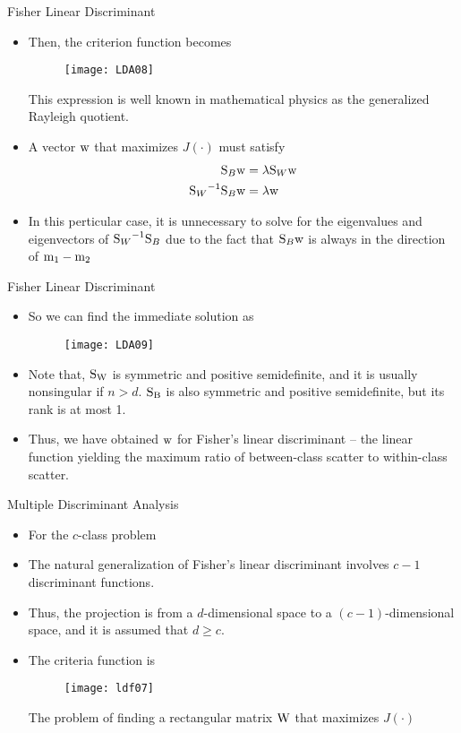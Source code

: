 \begin{frame}{Fisher Linear Discriminant}
\begin{itemize}
\item Then, the criterion function becomes
\begin{figure}
\texttt{[image: LDA08]}
\end{figure}
This expression is well known in mathematical physics as the generalized Rayleigh quotient.
\item A vector ${\rm w}$ that maximizes $J(\cdot)$ must satisfy
\begin{align}
{\rm S}_B{\rm w}&=\lambda {\rm S}_W{\rm w} \nonumber\\
{{\rm S}_W}^{-1}{\rm S}_B{\rm w}&=\lambda {\rm w}\nonumber
\end{align}
\item In this perticular case, it is unnecessary to solve for the eigenvalues and eigenvectors of ${{\rm S}_W}^{-1}{\rm S}_B$ due to the fact that ${\rm S}_B{\rm w}$ is always in the direction of ${\rm m}_1-{\rm m}_2$
\end{itemize}
\end{frame}

\begin{frame}{Fisher Linear Discriminant}
\begin{itemize}
\item So we can find the immediate solution as
\begin{figure}
\texttt{[image: LDA09]}
\end{figure}
\item Note that, ${\rm S_W}$ is symmetric and positive semidefinite, and it is usually nonsingular if $n > d$. ${\rm S_B}$ is also symmetric and positive semidefinite, but its rank is at most 1.
\item Thus, we have obtained ${\rm w}$ for Fisher's linear discriminant -- the linear function yielding the maximum ratio of between-class scatter to within-class scatter.
\end{itemize}
\end{frame}

\begin{frame}{Multiple Discriminant Analysis}
\begin{itemize}
\item For the $c$-class problem
\item The natural generalization of Fisher's linear discriminant involves $c-1$ discriminant functions.

\item Thus, the projection is from a $d$-dimensional space to a $(c-1)$-dimensional space, and it is assumed that $d\geq c$.
\item The criteria function is
\begin{figure}
\texttt{[image: ldf07]}
\end{figure}
The problem of finding a rectangular matrix ${\rm W}$ that maximizes $J(\cdot)$
\end{itemize}
\end{frame}

